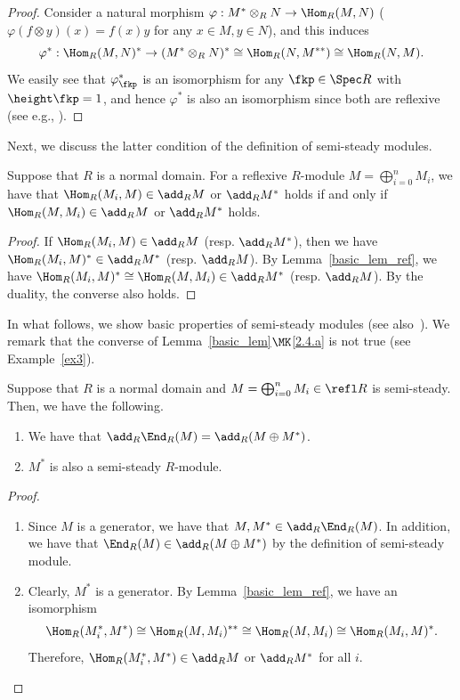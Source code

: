 \begin{proof}
Consider a natural morphism $\varphi:M^*\otimes_RN\rightarrow\Hom_R(M,N)$ ($\varphi(f\otimes y)(x)=f(x)y$ for any $x\in M, y\in N$), and this induces
\[
\varphi^*:\Hom_R(M,N)^*\rightarrow (M^*\otimes_RN)^*\cong\Hom_R(N,M^{**})\cong\Hom_R(N,M).
\]
We easily see that $\varphi_\fkp^*$ is an isomorphism for any $\fkp\in\Spec R$ with $\height\fkp=1$, and hence $\varphi^*$ is also an isomorphism since both are reflexive (see e.g., \cite[Lemma~5.11]{LW}).
\end{proof}

Next, we discuss the latter condition of the definition of semi-steady modules.

\begin{lemm}\label{dual_def}
Suppose that $R$ is a normal domain. For a reflexive $R$-module $M=\bigoplus_{i=0}^nM_i$, we have that $\Hom_R(M_i,M)\in\add_RM$ or $\add_RM^*$ holds if and only if $\Hom_R(M,M_i)\in\add_RM$ or $\add_RM^*$ holds.
\end{lemm}

\begin{proof}
If $\Hom_R(M_i,M)\in\add_RM$ (resp. $\add_RM^*$), then we have $\Hom_R(M_i,M)^*\in\add_RM^*$ (resp. $\add_RM$). By Lemma~\ref{basic_lem_ref}, we have $\Hom_R(M_i,M)^*\cong\Hom_R(M,M_i)\in\add_RM^*$ (resp. $\add_RM$). By the duality, the converse also holds.
\end{proof}

In what follows, we show basic properties of semi-steady modules (see also~\cite[Lemma~2.5]{IN}). We remark that the converse of Lemma~\ref{basic_lem}$\MK$\eqref{2.4.a} is not true (see Example~\ref{ex3}).

\begin{lemm}\label{basic_lem}
Suppose that $R$ is a normal domain and $M=\bigoplus_{i=0}^nM_i\in\refl R$ is semi-steady. Then, we have the following.
\begin{enumerate}%
\item \label{2.4.a} We have that $\add_R\End_R(M)=\add_R(M\oplus M^*)$.
\item \label{2.4.b} $M^*$ is also a semi-steady $R$-module.
\end{enumerate}
\end{lemm}

\begin{proof}\ 
\begin{enumerate}%
\item[\eqref{2.4.a}]
Since $M$ is a generator, we have that $M, M^*\in\add_R\End_R(M)$. In addition, we have that $\End_R(M)\in\add_R(M\oplus M^*)$ by the definition of semi-steady module.
\item[\eqref{2.4.b}]
Clearly, $M^*$ is a generator. By Lemma~\ref{basic_lem_ref}, we have an isomorphism
\[
\Hom_R(M_i^*,M^*)\cong\Hom_R(M,M_i)^{**}\cong\Hom_R(M,M_i)\cong\Hom_R(M_i,M)^*.
\]
Therefore, $\Hom_R(M_i^*,M^*)\in\add_RM$ or $\add_RM^*$ for all $i$.\qedhere
\end{enumerate}
\end{proof}

